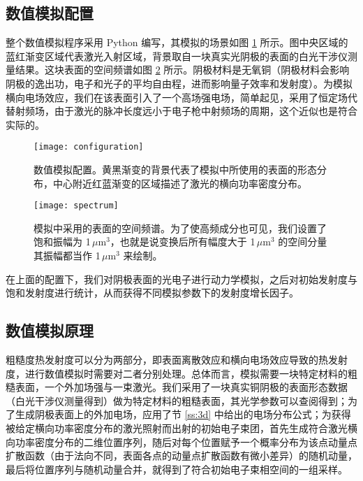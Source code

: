 \subsection{\label{ss:sim-conf}数值模拟配置}
整个数值模拟程序采用 Python 编写，其模拟的场景如图 \ref{fig:conf} 所示。图中央区域的蓝红渐变区域代表激光入射区域，背景取自一块真实光阴极的表面的白光干涉仪测量结果。这块表面的空间频谱如图 \ref{fig:spec} 所示。阴极材料是无氧铜（阴极材料会影响阴极的逸出功，电子和光子的平均自由程，进而影响量子效率和发射度）。为模拟横向电场效应，我们在该表面引入了一个高场强电场，简单起见，采用了恒定场代替射频场，由于激光的脉冲长度远小于电子枪中射频场的周期，这个近似也是符合实际的。
\begin{figure}[htbp]
\centering
\texttt{[image: configuration]}
\caption{\label{fig:conf} 数值模拟配置。黄黑渐变的背景代表了模拟中所使用的表面的形态分布，中心附近红蓝渐变的区域描述了激光的横向功率密度分布。}
\end{figure}

\begin{figure}[htbp]
\centering
\texttt{[image: spectrum]}
\caption{\label{fig:spec} 模拟中采用的表面的空间频谱。为了使高频成分也可见，我们设置了饱和振幅为 1\,$\mu\text{m}^{3}$，也就是说变换后所有幅度大于 1\,$\mu\text{m}^{3}$ 的空间分量其振幅都当作 1\,$\mu\text{m}^{3}$ 来绘制。}
\end{figure}

在上面的配置下，我们对阴极表面的光电子进行动力学模拟，之后对初始发射度与饱和发射度进行统计，从而获得不同模拟参数下的发射度增长因子。

\subsection{\label{ss:sim-prin}数值模拟原理}
粗糙度热发射度可以分为两部分，即表面离散效应和横向电场效应导致的热发射度，进行数值模拟时需要对二者分别处理。总体而言，模拟需要一块特定材料的粗糙表面，一个外加场强与一束激光。我们采用了一块真实铜阴极的表面形态数据（白光干涉仪测量得到）做为特定材料的粗糙表面，其光学参数可以查阅得到；为了生成阴极表面上的外加电场，应用了节 \ref{ss:3d} 中给出的电场分布公式；为获得被给定横向功率密度分布的激光照射而出射的初始电子束团，首先生成符合激光横向功率密度分布的二维位置序列，随后对每个位置赋予一个概率分布为该点动量点扩散函数（由于法向不同，表面各点的动量点扩散函数有微小差异）的随机动量，最后将位置序列与随机动量合并，就得到了符合初始电子束相空间的一组采样。

